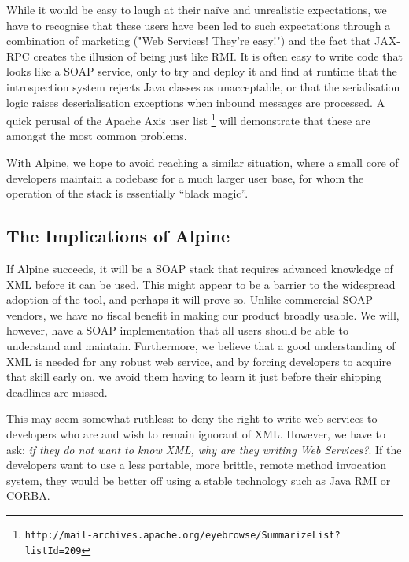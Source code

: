 While it would be easy to laugh at their na\"{i}ve and unrealistic
expectations, we have to recognise that these users have been led to
such expectations through a combination of marketing ("Web Services!
They're easy!") and the fact that JAX-RPC creates the illusion of
being just like RMI. It is often easy to write code that looks like a
SOAP service, only to try and deploy it and find at runtime that the
introspection system rejects Java classes as unacceptable, or that the
serialisation logic raises deserialisation exceptions when inbound
messages are processed. A quick perusal of the Apache Axis user list
\footnote{{\small \tt http://mail-archives.apache.org/eyebrowse/SummarizeList?listId=209}}
will demonstrate that these are amongst the most common problems.

With Alpine, we hope to avoid reaching a similar situation, where a
small core of developers maintain a codebase for a much larger user
base, for whom the operation of the stack is essentially ``black
magic''.

\subsection{The Implications of Alpine}
\label{alpine:implications}

If Alpine succeeds, it will be a SOAP stack that requires advanced
knowledge of XML before it can be used. This might appear to be a
barrier to the widespread adoption of the tool, and perhaps it will
prove so. Unlike commercial SOAP vendors, we have no fiscal benefit in
making our product broadly usable. We will, however, have a SOAP
implementation that all users should be able to understand and
maintain.  Furthermore, we believe that a good understanding of XML is
needed for any robust web service, and by forcing developers to
acquire that skill early on, we avoid them having to learn it just
before their shipping deadlines are missed.

This may seem somewhat ruthless: to deny the right to write web
services to developers who are and wish to remain ignorant of XML.
However, we have to ask: \emph{if they do not want to know XML, why are
they writing Web Services?}. If the developers want to use a less portable,
more brittle, remote method invocation system, they would be better off
using a stable technology such as Java RMI or CORBA.

